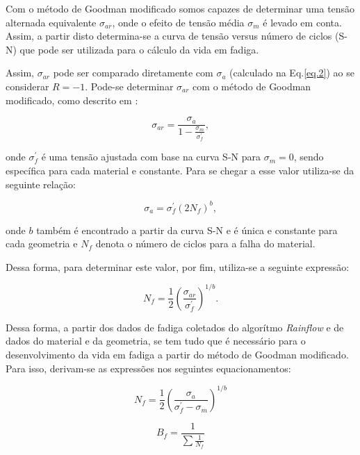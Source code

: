 Com o método de Goodman modificado somos capazes de determinar uma tensão alternada equivalente $\sigma_{ar}$, onde o efeito de tensão média $\sigma_{m}$ é levado em conta. Assim, a partir disto determina-se a curva de tensão versus número de ciclos (S-N) que pode ser utilizada para o cálculo da vida em fadiga.

Assim, $\sigma_{ar}$ pode ser comparado diretamente com $\sigma_{a}$ (calculado na Eq.\ref{eq.2}) ao se considerar $R = -1$. Pode-se determinar $\sigma_{ar}$ com o método de Goodman modificado, como descrito em \cite{dowling2007}:

\begin{equation}
    \sigma_{ar} = \frac{\sigma_a}{1 - \frac{\sigma_m}{\sigma_f^\prime}},
\end{equation}

onde $\sigma_f^\prime$ é uma tensão ajustada com base na curva S-N para $\sigma_m = 0$, sendo específica para cada material e constante. Para se chegar a esse valor utiliza-se da seguinte relação:

\begin{equation}
    \sigma_a = \sigma_f^\prime \left( 2 N_f \right)^{b},
\end{equation}

onde $b$ também é encontrado a partir da curva S-N e é única e constante para cada geometria e $N_f$ denota o número de ciclos para a falha do material.

Dessa forma, para determinar este valor, por fim, utiliza-se a seguinte expressão:


\begin{equation}
    N_f = \frac{1}{2} \left( \frac{\sigma_{ar}}{\sigma_f^\prime}  \right)^{1/b}.
\end{equation}

Dessa forma, a partir dos dados  de fadiga coletados do algorítmo \emph{Rainflow} e de dados do material e da geometria, se tem tudo que é necessário para o desenvolvimento da vida em fadiga a partir do método de Goodman modificado. Para isso, derivam-se as expressões nos seguintes equacionamentos:

\begin{equation}
    N_f = \frac{1}{2} \left( \frac{\sigma_a}{\sigma^\prime_f - \sigma_m } \right)^{1/b}
\end{equation}

\begin{equation}
    B_f = \frac{1}{\sum \frac{1}{N_f}}
\end{equation}

